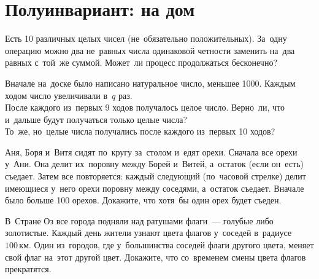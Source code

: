 
\section*{Полуинвариант: на дом}




\begin{problems}

Есть 10 различных целых чисел (не~обязательно положительных).
За~одну операцию можно два не~равных числа одинаковой четности заменить
на~два равных с~той~же суммой.
Может~ли процесс продолжаться бесконечно?

Вначале на~доске было написано натуральное число, меньшее 1000.
Каждым ходом число увеличивали в~$q$ раз.
\\
\sp
После каждого из~первых 9 ходов получалось целое число.
Верно~ли, что и~дальше будут получаться только целые числа?
\\
\sp
То~же, но~целые числа получались после каждого из~первых 10 ходов?

Аня, Боря и~Витя сидят по~кругу за~столом и~едят орехи.
Сначала все орехи у~Ани.
Она делит их~поровну между Борей и~Витей, а~остаток (если он~есть) съедает.
Затем все повторяется: каждый следующий (по~часовой стрелке) делит имеющиеся
у~него орехи поровну между соседями, а~остаток съедает.
Вначале было больше 100 орехов.
Докажите, что хотя~бы один орех будет съеден.

В~Стране Оз все города подняли над ратушами флаги~--- голубые либо золотистые.
Каждый день жители узнают цвета флагов у~соседей в~радиусе $100\,\text{км}$.
Один из~городов, где у~большинства соседей флаги другого цвета, меняет свой
флаг на~этот другой цвет.
Докажите, что со~временем смены цвета флагов прекратятся.

\end{problems}

